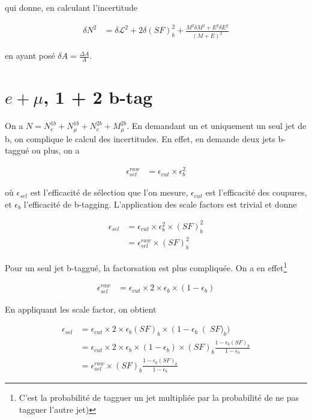 \documentclass[a4paper,11pt]{article}
\begin{document}
qui donne, en calculant l'incertitude

\begin{align}
  \delta N^2 &= \delta \mathcal{L}^2 + 2 \delta (SF)_b^2 + \frac{M^2 \delta M^2 + E^2 \delta E^2}{\left(M + E\right)^2}
\end{align}

en ayant posé $\delta A = \frac{\Delta A}{A}$.


\section{$e + \mu$, 1 + 2 b-tag}

On a $N = N_e^{1b} + N_\mu^{1b} + N_e^{2b} + M_\mu^{2b}$. En demandant un et uniquement un seul jet de b, on complique le calcul des incertitudes. En effet, en demande deux jets b-taggué ou plus, on a

\begin{align}
  \epsilon_{sel}^{raw} &= \epsilon_{cut} \times \epsilon_{b}^2
\end{align}

où $\epsilon_{sel}$ est l'efficacité de sélection que l'on mesure, $\epsilon_{cut}$ est l'efficacité des coupures, et $\epsilon_b$ l'efficacité de b-tagging. L'application des scale factors est trivial et donne

\begin{align}
  \epsilon_{sel} &= \epsilon_{cut} \times \epsilon_{b}^2 \times (SF)_b^2 \\
  &= \epsilon_{sel}^{raw} \times (SF)_b^2
\end{align}

Pour un seul jet b-taggué, la factorsation est plus compliquée. On a en effet\footnote{C'est la probabilité de tagguer un jet multipliée par la probabilité de ne pas tagguer l'autre jet)}

\begin{align}
  \epsilon_{sel}^{raw} &= \epsilon_{cut} \times 2 \times \epsilon_{b} \times \left( 1 - \epsilon_b \right)
\end{align}

En appliquant les scale factor, on obtient

\begin{align}
  \epsilon_{sel} &= \epsilon_{cut} \times 2 \times \epsilon_{b} (SF)_b \times \left( 1 - \epsilon_b \right (SF)_b)\\
  &= \epsilon_{cut} \times 2 \times \epsilon_{b} \times \left(1 - \epsilon_b \right) \times (SF)_b \frac{1 - \epsilon_b (SF)_b}{1 - \epsilon_b} \\
  &= \epsilon_{sel}^{raw} \times (SF)_b \frac{1 - \epsilon_b (SF)_b}{1 - \epsilon_b}
\end{align}
\end{document}
